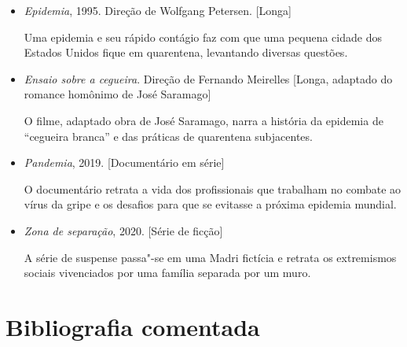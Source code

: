 \documentclass[12pt]{extarticle}
\begin{document}
\begin{itemize}
\item \emph{Epidemia}, 1995. Direção de Wolfgang Petersen. {[}Longa{]}

Uma epidemia e seu rápido contágio faz com que uma pequena cidade dos Estados Unidos 
fique em quarentena, levantando diversas questões.

\item \emph{Ensaio sobre a cegueira}. Direção de Fernando Meirelles {[}Longa,
adaptado do romance homônimo de José Saramago{]}

O filme, adaptado obra de José Saramago, narra a história da epidemia de ``cegueira
branca'' e das práticas de quarentena subjacentes.

\item \emph{Pandemia}, 2019. {[}Documentário em série{]}

O documentário retrata a vida dos profissionais que trabalham no combate ao 
vírus da gripe e os desafios para que se evitasse a próxima epidemia mundial.

\item \emph{Zona de separação}, 2020. {[}Série de ficção{]}

A série de suspense passa"-se em uma Madri fictícia e retrata os extremismos 
sociais vivenciados por uma família separada por um muro. 
\end{itemize}


\section{Bibliografia comentada}
\end{document}
